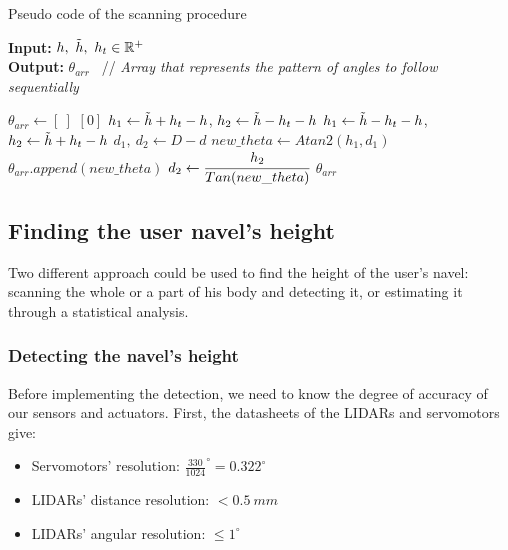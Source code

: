 \documentclass{article}
\begin{document}
\begin{algorithm}[H]
    \caption{Pseudo code of the scanning procedure}
    \label{alg:scan_algo}
    
    \hspace*{\algorithmicindent} \textbf{Input:} $h,\ \Tilde{h},\ h_t \in \mathbb{R}^+ $ \\
    \hspace*{\algorithmicindent} \textbf{Output:} $\theta_{arr}$ \ // \textit{Array that represents the pattern of angles to follow sequentially}
    \begin{algorithmic}[1]
        \STATE $\theta_{arr} \leftarrow [\ ]$
            \RETURN  $[0]$
        \ENDIF 
            \STATE $h_1 \leftarrow \Tilde{h}+h_t-h$, $h_2 \leftarrow  \Tilde{h}-h_t-h$
        \ELSE
            \STATE $h_1 \leftarrow \Tilde{h}-h_t-h$, $h_2 \leftarrow  \Tilde{h}+h_t-h$
        \ENDIF
        \STATE $d_1,\ d_2 \leftarrow D-d$
            \STATE $new\_theta \leftarrow Atan2(h_1,d_1)$
            \STATE $\theta_{arr}.append(new\_theta)$
            \STATE $d_2 \leftarrow \cfrac{h_2}{Tan(new\_theta)}$
        \ENDWHILE
        \RETURN $\theta_{arr}$
    \end{algorithmic}
\end{algorithm}


\subsection{Finding the user navel's height}

Two different approach could be used to find the height of the user's navel: scanning the whole or a part of his body and detecting it, or estimating it through a statistical analysis.

\subsubsection{Detecting the navel's height}

Before implementing the detection, we need to know the degree of accuracy of our sensors and actuators. First, the datasheets of the LIDARs and servomotors give:

\begin{itemize}
    \item Servomotors' resolution: $\frac{330}{1024}^\circ = 0.322^\circ$
    \item LIDARs' distance resolution: $<0.5\ mm$ 
    \item LIDARs' angular resolution: $\leq 1^\circ$ 
\end{itemize}
\end{document}
